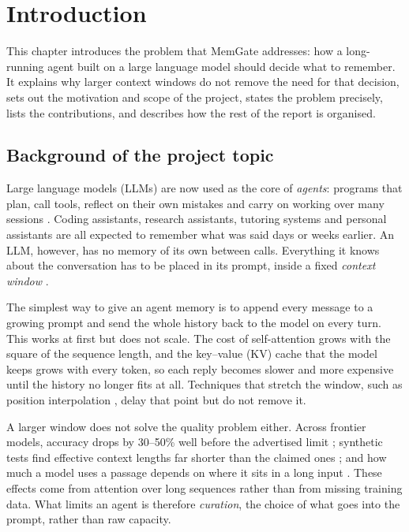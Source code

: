 \chapter{Introduction}
\label{ch:intro}

This chapter introduces the problem that MemGate addresses: how a long-running
agent built on a large language model should decide what to remember. It
explains why larger context windows do not remove the need for that decision,
sets out the motivation and scope of the project, states the problem
precisely, lists the contributions, and describes how the rest of the report
is organised.

\section{Background of the project topic}

Large language models (LLMs) are now used as the core of \emph{agents}:
programs that plan, call tools, reflect on their own mistakes and carry on
working over many sessions
\cite{yao2023react,shinn2023reflexion,wang2024agentsurvey,xi2023agentsurvey}.
Coding assistants, research assistants, tutoring systems and personal
assistants are all expected to remember what was said days or weeks earlier.
An LLM, however, has no memory of its own between calls. Everything it knows
about the conversation has to be placed in its prompt, inside a fixed
\emph{context window} \cite{brown2020gpt3}.

The simplest way to give an agent memory is to append every message to a
growing prompt and send the whole history back to the model on every turn.
This works at first but does not scale. The cost of self-attention grows with
the square of the sequence length, and the key--value (KV) cache that the
model keeps grows with every token, so each reply becomes slower and more
expensive until the history no longer fits at all. Techniques that stretch the
window, such as position interpolation \cite{peng2024yarn}, delay that point
but do not remove it.

A larger window does not solve the quality problem either. Across frontier
models, accuracy drops by 30--50\% well before the advertised limit
\cite{chroma2025contextrot}; synthetic tests find effective context lengths
far shorter than the claimed ones \cite{hsieh2024ruler}; and how much a model
uses a passage depends on where it sits in a long input
\cite{liu2024lostmiddle}. These effects come from attention over long
sequences rather than from missing training data. What limits an agent is
therefore \emph{curation}, the choice of what goes into the prompt, rather than
raw capacity.

